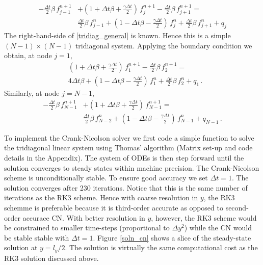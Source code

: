 \documentclass[11pt]{article}
\newcommand{\per}{\, .}
\begin{document}
\begin{enumerate}[label=(\alph*)]
        \begin{align}
            \label{tridiag_general}
            -\tfrac{\Delta t}{2}\beta\,f_{j-1}^{n+1} & + \left(1 + \Delta t \beta + \tfrac{\gamma \Delta t}{2}\right)\,f_j^{n+1} -\tfrac{\Delta t}{2}\beta\,f_{j+1}^{n+1} =   \nonumber \\ &\tfrac{\Delta t}{2}\beta\,f_{j-1}^{n}+\left(1 - \Delta t \beta - \tfrac{\gamma \Delta t}{2}\right)\,f_j^{n} + \tfrac{\Delta t}{2}\beta\,f_{j+1}^{n} + q_j
        \end{align}
        The right-hand-side of \eqref{tridiag_general} is known. Hence this is a simple $(N-1)\times(N-1)$ tridiagonal system. Applying the boundary condition we obtain, at node $j=1$,
        \begin{align}
            \label{tridiag_general_1}
            &  \left(1 + \Delta t \beta + \tfrac{\gamma \Delta t}{2}\right)\,f_1^{n+1} -\tfrac{\Delta t}{2}\beta\,f_{2}^{n+1} =   \nonumber \\ &4\Delta t\beta+\left(1 - \Delta t \beta - \tfrac{\gamma \Delta t}{2}\right)\,f_1^{n} + \tfrac{\Delta t}{2}\beta\,f_{2}^{n} + q_1\per
        \end{align}
        Similarly, at node $j=N-1$,
          \begin{align}
            \label{tridiag_general_N1}
            -\tfrac{\Delta t}{2}\beta\,f_{N-1}^{n+1} & + \left(1 + \Delta t \beta + \tfrac{\gamma \Delta t}{2}\right)\,f_{N-1}^{n+1} =   \nonumber \\ &\tfrac{\Delta t}{2}\beta\,f_{N-2}^{n}+\left(1 - \Delta t \beta - \tfrac{\gamma \Delta t}{2}\right)\,f_{N-1}^{n}+ q_{N-1}\per
        \end{align}


        To implement the Crank-Nicolson solver we first code a simple function to solve the tridiagonal linear system using Thomas' algorithm (Matrix set-up and code details in the Appendix). The system of ODEs is then step forward until the solution converges to steady states within machine precision. The Crank-Nicolson scheme is unconditionally stable. To ensure good accuracy we set $\Delta t = 1$. The solution converges after 230 iterations. Notice that this is the same number of iterations as the RK3 scheme.  Hence with coarse resolution in $y$, the RK3 schemme is preferable because it is third-order accurate as opposed to second-order accurace CN. With better resolution in $y$, however, the RK3 scheme would be constrained to smaller time-steps (proportional to $\Delta y^2$) while the CN would be stable stable with $\Delta t =1$.  Figure \ref{soln_cn} shows a slice of the steady-state solution at $y=l_y/2$. The solution is virtually the same computational cost as the RK3 solution discussed above. 



\end{enumerate}
\end{document}
